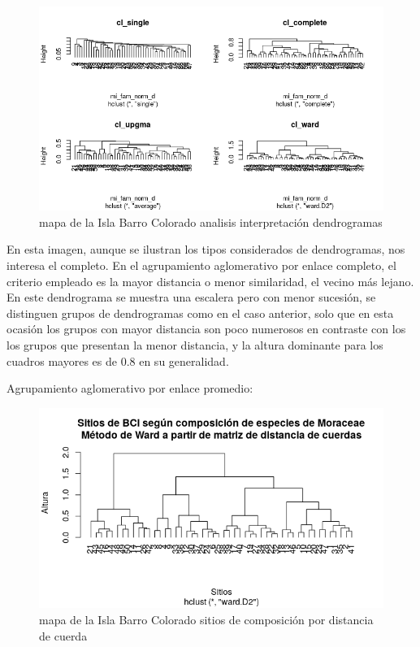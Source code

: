 \documentclass[11pt,]{article}
\begin{document}
\begin{figure}
\centering
\includegraphics[width=1.00000\textwidth]{analisis_interpretacion_dendrogramas.png}
\caption{mapa de la Isla Barro Colorado analisis interpretación
dendrogramas \label{fig:bci_map}}
\end{figure}

En esta imagen, aunque se ilustran los tipos considerados de
dendrogramas, nos interesa el completo. En el agrupamiento aglomerativo
por enlace completo, el criterio empleado es la mayor distancia o menor
similaridad, el vecino más lejano. En este dendrograma se muestra una
escalera pero con menor sucesión, se distinguen grupos de dendrogramas
como en el caso anterior, solo que en esta ocasión los grupos con mayor
distancia son poco numerosos en contraste con los los grupos que
presentan la menor distancia, y la altura dominante para los cuadros
mayores es de 0.8 en su generalidad.

Agrupamiento aglomerativo por enlace promedio:

\begin{figure}
\centering
\includegraphics[width=1.00000\textwidth]{sitios_metodo_ward.png}
\caption{mapa de la Isla Barro Colorado sitios de composición por
distancia de cuerda \label{fig:bci_map}}
\end{figure}
\end{document}

